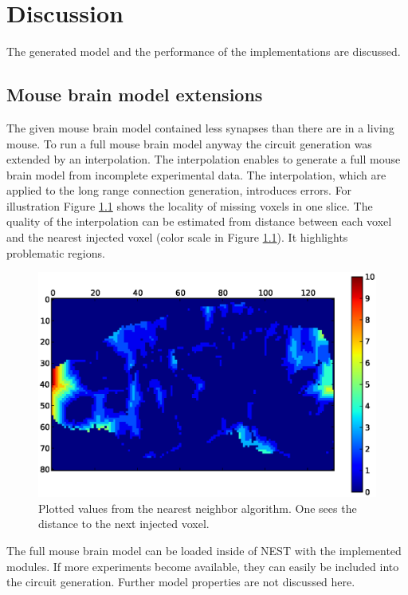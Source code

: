 \chapter{Discussion}
The generated model and the performance of the implementations are discussed.

\section{Mouse brain model extensions}
The given mouse brain model contained less synapses than there are in a living mouse.
To run a full mouse brain model anyway the circuit generation was extended by an interpolation.
The interpolation enables to generate a full mouse brain model from incomplete experimental data.
The interpolation, which are applied to the long range connection generation, introduces errors.
For illustration Figure \ref{interpolationdistance} shows the locality of missing voxels in one slice.
The quality of the interpolation can be estimated from distance between each voxel and the nearest injected voxel (color scale in Figure \ref{interpolationdistance}).
It highlights problematic regions.
\begin{figure}[ht!]
\centering
\includegraphics[scale=0.5]{pictures/distance_x_y_70.eps}
\caption{Plotted values from the nearest neighbor algorithm. One sees the distance to the next injected voxel.}
\label{interpolationdistance}
\end{figure}
The full mouse brain model can be loaded inside of NEST with the implemented modules.
If more experiments become available, they can easily be included into
the circuit generation. Further model properties are not discussed here.



